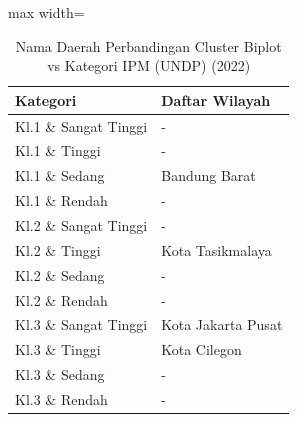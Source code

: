 \begin{table}[H]
\centering
\caption{Nama Daerah Perbandingan Cluster Biplot vs Kategori IPM (UNDP) (2022)} \label{tab:samplecrossname2022}
\begin{adjustbox}{max width=\textwidth}
\begin{tabular}{|p{4cm}|p{10cm}|}
\hline
\textbf{Kategori} & \textbf{Daftar Wilayah} \\
\hline
Kl.1 \& Sangat Tinggi & - \\
\hline
Kl.1 \& Tinggi & - \\
\hline
Kl.1 \& Sedang & Bandung Barat \\
\hline
Kl.1 \& Rendah & - \\
\hline
Kl.2 \& Sangat Tinggi & - \\
\hline
Kl.2 \& Tinggi & Kota Tasikmalaya \\
\hline
Kl.2 \& Sedang & - \\
\hline
Kl.2 \& Rendah & - \\
\hline
Kl.3 \& Sangat Tinggi & Kota Jakarta Pusat \\
\hline
Kl.3 \& Tinggi & Kota Cilegon \\
\hline
Kl.3 \& Sedang & - \\
\hline
Kl.3 \& Rendah & - \\
\hline
\end{tabular}
\end{adjustbox}
\end{table}